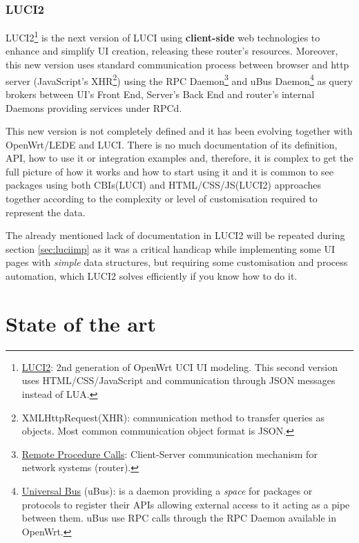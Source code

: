 \subsubsection{LUCI2}
LUCI2\footnote{\href{https://wiki.openwrt.org/doc/techref/luci2}{LUCI2}: 2nd generation of OpenWrt UCI UI modeling. This second version uses HTML/CSS/JavaScript and communication through JSON messages instead of LUA.} is the next version of LUCI using \textbf{client-side} web technologies to enhance and simplify UI creation, releasing these router's resources. Moreover, this new version uses standard communication process between browser and http server (JavaScript's XHR\footnote{XMLHttpRequest(XHR): communication method to transfer queries as objects. Most common communication object format is JSON.}) using the RPC Daemon\footnote{\href{https://wiki.openwrt.org/doc/techref/rpcd}{Remote Procedure Calls}: Client-Server communication mechanism for network systems (router).} and uBus Daemon\footnote{\href{https://wiki.openwrt.org/doc/techref/ubus}{Universal Bus} (uBus): is a daemon providing a \textit{space} for packages or protocols to register their APIs allowing external access to it acting as a pipe between them. uBus use RPC calls through the RPC Daemon available in OpenWrt.} as query brokers between UI's Front End, Server's Back End and router's internal Daemons providing services under RPCd.

This new version is not completely defined and it has been evolving together with OpenWrt/LEDE and LUCI. There is no much documentation of its definition, API, how to use it or integration examples and, therefore, it is complex to get the full picture of how it works and how to start using it and it is common to see packages using both CBIs(LUCI) and HTML/CSS/JS(LUCI2) approaches together according to the complexity or level of customisation required to represent the data.

The already mentioned lack of documentation in LUCI2 will be repeated during section \ref{sec:luciimp} as it was a critical handicap while implementing some UI pages with \textit{simple} data structures, but requiring some customisation and process automation, which LUCI2 solves efficiently if you know how to do it.

\section{State of the art}
\label{sec:soa}
